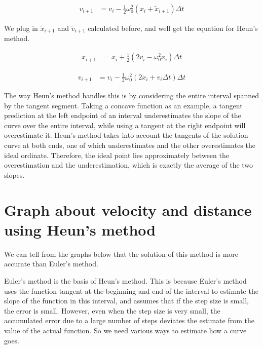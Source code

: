 \documentclass[12pt]{article}
\begin{document}
\begin{align}
    v_{i+1} &= v_{i} - \frac{1}{2} \omega_{0}^2 (x_{i} + \tilde{x}_{i+1}) \Delta t
\end{align}

We plug in $\tilde{x}_{i+1}$ and $\tilde{v}_{i+1}$ calculated before, and well get the equation for Heun's method. 

\begin{align}
    x_{i+1} &= x_{i} + \frac{1}{2} (2v_{i} - \omega_{0}^2 x_{i}) \Delta t
\end{align}

\begin{align}
    v_{i+1} &= v_{i} - \frac{1}{2} \omega_{0}^2 (2x_{i} + v_{i} \Delta t) \Delta t
\end{align}

The way Heun's method handles this is by considering the entire interval spanned by the tangent segment. Taking a concave function as an example, a tangent prediction at the left endpoint of an interval underestimates the slope of the curve over the entire interval, while using a tangent at the right endpoint will overestimate it. Heun's method takes into account the tangents of the solution curve at both ends, one of which underestimates and the other overestimates the ideal ordinate. Therefore, the ideal point lies approximately between the overestimation and the underestimation, which is exactly the average of the two slopes.

\section{Graph about velocity and distance using Heun's method}

We can tell from the graphs below that the solution of this method is more accurate than Euler's method. 



Euler's method is the basis of Heun's method. This is because Euler's method uses the function tangent at the beginning and end of the interval to estimate the slope of the function in this interval, and assumes that if the step size is small, the error is small. However, even when the step size is very small, the accumulated error due to a large number of steps deviates the estimate from the value of the actual function. So we need various ways to estimate how a curve goes. 



\begin{thebibliography}{9}


\end{thebibliography}

\end{document}
